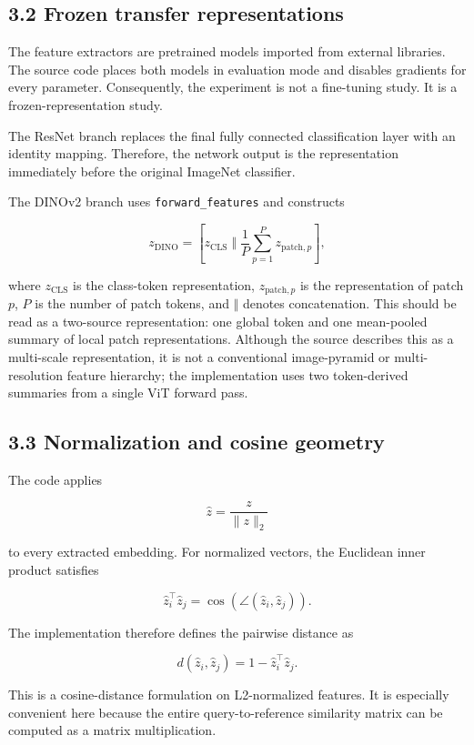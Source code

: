 \documentclass[
  11pt,
]{article}
\begin{document}
\subsection{3.2 Frozen transfer
representations}\label{frozen-transfer-representations}

The feature extractors are pretrained models imported from external
libraries. The source code places both models in evaluation mode and
disables gradients for every parameter. Consequently, the experiment is
not a fine-tuning study. It is a frozen-representation study.

The ResNet branch replaces the final fully connected classification
layer with an identity mapping. Therefore, the network output is the
representation immediately before the original ImageNet classifier.

The DINOv2 branch uses \texttt{forward\_features} and constructs

\[
z_{\mathrm{DINO}}
=
\left[
z_{\mathrm{CLS}}
\;\Vert\;
\frac{1}{P}\sum_{p=1}^{P} z_{\mathrm{patch},p}
\right],
\]

where \(z_{\mathrm{CLS}}\) is the class-token representation,
\(z_{\mathrm{patch},p}\) is the representation of patch \(p\), \(P\) is
the number of patch tokens, and \(\Vert\) denotes concatenation. This
should be read as a two-source representation: one global token and one
mean-pooled summary of local patch representations. Although the source
describes this as a multi-scale representation, it is not a conventional
image-pyramid or multi-resolution feature hierarchy; the implementation
uses two token-derived summaries from a single ViT forward pass.

\subsection{3.3 Normalization and cosine
geometry}\label{normalization-and-cosine-geometry}

The code applies

\[
\hat z
=
\frac{z}{\lVert z\rVert_2}
\]

to every extracted embedding. For normalized vectors, the Euclidean
inner product satisfies

\[
\hat z_i^{\top}\hat z_j
=
\cos\!\left(\angle(\hat z_i,\hat z_j)\right).
\]

The implementation therefore defines the pairwise distance as

\[
d(\hat z_i,\hat z_j)
=
1-\hat z_i^{\top}\hat z_j.
\]

This is a cosine-distance formulation on L2-normalized features. It is
especially convenient here because the entire query-to-reference
similarity matrix can be computed as a matrix multiplication.
\end{document}
